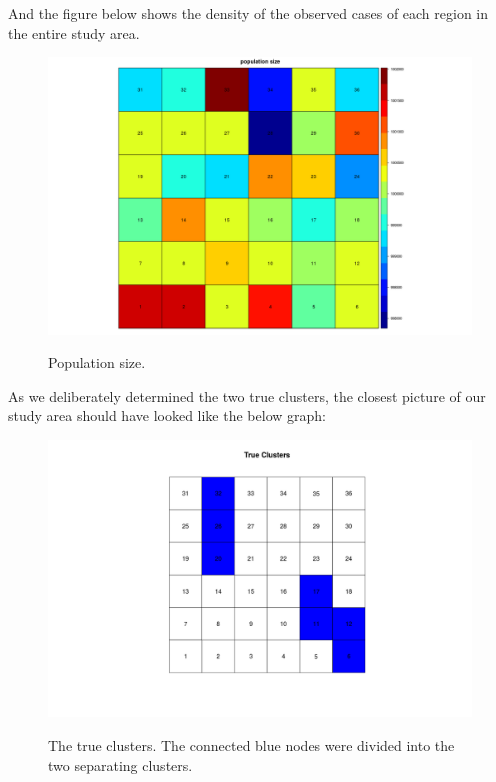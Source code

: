 \documentclass[12pt]{article}
\begin{document}
	And the figure below shows the density of the observed cases of each region in the entire study area.\\
	
	\begin{figure}[!ht]
		
		\centering
		\includegraphics[scale=0.2]{Population}\\
		\caption{Population size.\label{f:gull}}
		
	\end{figure}
	
	
	As we deliberately determined the two true clusters, the closest picture of our study area should have looked like the below graph: \\
	
	\begin{figure}[!ht]
	\centering
	\includegraphics[scale=0.25]{Ex1_True}\\ 
	\caption {The true clusters. The connected blue nodes were divided into the two separating clusters.\label{f:gull}}
	 \end{figure}
\end{document}
